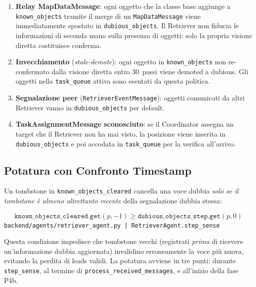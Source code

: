 \begin{enumerate}
    \item \textbf{Relay MapDataMessage}: ogni oggetto che la classe base aggiunge a
          \texttt{known\_objects} tramite il merge di un \texttt{MapDataMessage} viene
          immediatamente spostato in \texttt{dubious\_objects}. Il Retriever non fiducia
          le informazioni di seconda mano sulla presenza di oggetti: solo la propria
          visione diretta costituisce conferma.
    \item \textbf{Invecchiamento} (\textit{stale-demote}): ogni oggetto in
          \texttt{known\_objects} non re-confermato dalla visione diretta entro
          30~passi viene demoted a dubious. Gli oggetti nella \texttt{task\_queue}
          attiva sono esentati da questa politica.
    \item \textbf{Segnalazione peer} (\texttt{RetrieverEventMessage}): oggetti
          comunicati da altri Retriever vanno in \texttt{dubious\_objects} per default.
    \item \textbf{TaskAssignmentMessage sconosciuto}: se il Coordinator assegna un
          target che il Retriever non ha mai visto, la posizione viene inserita in
          \texttt{dubious\_objects} e poi accodata in \texttt{task\_queue} per la
          verifica all'arrivo.
\end{enumerate}

\subsection{Potatura con Confronto Timestamp}

Un tombstone in \texttt{known\_objects\_cleared} cancella una voce dubbia
\textit{solo se il tombstone \`e almeno altrettanto recente} della segnalazione
dubbia stessa:

$$\texttt{known\_objects\_cleared.get}(p, -1) \geq \texttt{dubious\_objects\_step.get}(p, 0)$$
\noindent\hfill{\footnotesize\texttt{backend/agents/retriever\_agent.py | RetrieverAgent.step\_sense}}

Questa condizione impedisce che tombstone vecchi (registrati \textit{prima} di
ricevere un'informazione dubbia aggiornata) invalidino erroneamente la voce pi\`u
nuova, evitando la perdita di leads validi.  La potatura avviene in tre punti:
durante \texttt{step\_sense}, al termine di \texttt{process\_received\_messages},
e all'inizio della fase P4b.

